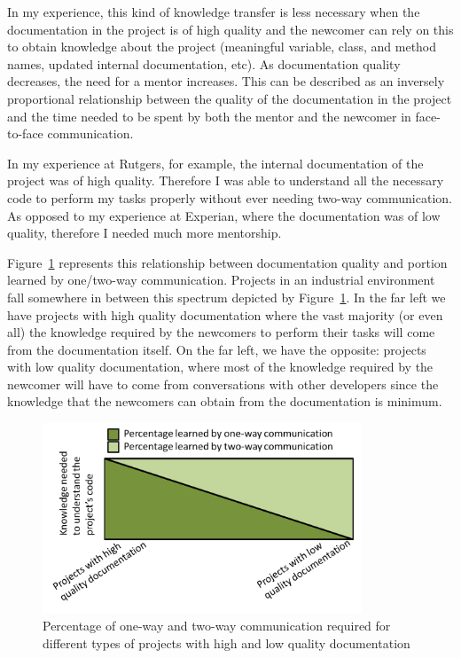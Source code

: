 \documentclass[12pt, letterpaper]{article}
\begin{document}
In my experience, this kind of knowledge transfer is less necessary when the documentation in the project is of high
quality and the newcomer can rely on this to obtain knowledge about the project (meaningful variable, class, and 
method names, updated internal documentation, etc). As documentation quality decreases, the need for a mentor increases.
This can be described
as an inversely proportional relationship between the quality of the documentation in the project and the 
time needed to be spent by both the mentor and the newcomer in face-to-face communication.

In my experience at Rutgers, for example, the internal documentation of the project was of high quality. Therefore
I was able to understand all the necessary code to perform my tasks properly without ever needing two-way 
communication. As opposed to my experience at Experian, where the documentation was of low quality, therefore
I needed much more mentorship.

Figure~\ref{graph1} represents this relationship between documentation quality and portion learned by
one/two-way communication. Projects in an industrial environment fall somewhere in between this spectrum 
depicted by Figure~\ref{graph1}. In the far left we have projects with high quality documentation where the vast
majority (or even all) the knowledge required by the newcomers to perform their tasks will come from the 
documentation itself. On the far left, we have the opposite: projects with low quality documentation, where most 
of the knowledge required by the newcomer will have to come from conversations with other developers since
the knowledge that the newcomers can obtain from the documentation is minimum.


\begin{figure}[h]
    \centering
    \includegraphics[width=0.85\textwidth]{Graph1}
    \caption{Percentage of one-way and two-way communication required for different types of projects with high and low quality documentation}
    \label{graph1}
\end{figure}
\end{document}
